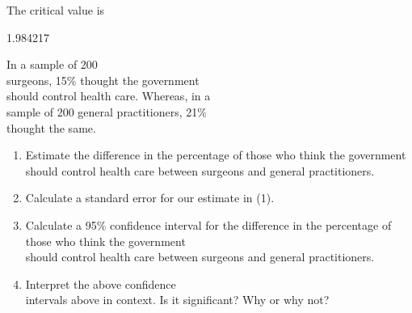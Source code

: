 \documentclass[11pt]{book}\usepackage[]{graphicx}\usepackage[]{color}
\begin{document}
\begin{exercises}
\begin{solution}
   The critical value is


  1.984217

  \end{solution}

  \begin{exercise} %

In a sample of 200 \\ surgeons, 15\% thought the government \\ should control health care.  Whereas, in a \\ sample of 200 general practitioners, 21\% \\ thought the same.

\begin{enumerate}
\item Estimate the difference in the percentage of those who think the government should control health care between surgeons and general practitioners.
\item Calculate a standard error for our estimate in (1).
\item Calculate a 95\% confidence interval for the difference in the percentage of \\ those  who think the government \\ should control health care between surgeons and general practitioners.
\item Interpret the above confidence \\ intervals above in context.  Is it significant? Why or why not?
\end{enumerate}
  \end{exercise}



\end{exercises}
\end{document}
